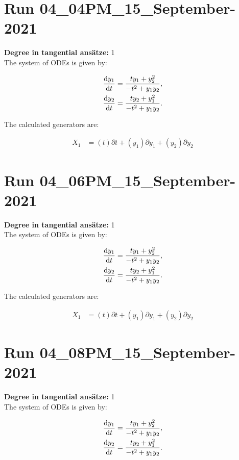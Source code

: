 \section*{Run 04\_04PM\_15\_September-2021}
\textbf{Degree in tangential ansätze:}	1\\
The system of ODEs is given by:

\begin{align*}
\dv{y_{1}}{t}&=\frac{t y_{1} + y_{2}^{2}}{- t^{2} + y_{1} y_{2}},\\
\dv{y_{2}}{t}&=\frac{t y_{2} + y_{1}^{2}}{- t^{2} + y_{1} y_{2}}.\\
\end{align*}

\noindent The calculated generators are:

\begin{align*}
X_{1}&=\left( t \right)\partial t+\left( y_{1} \right)\partial y_{1}+\left( y_{2} \right)\partial y_{2}\end{align*}
\section*{Run 04\_06PM\_15\_September-2021}
\textbf{Degree in tangential ansätze:}	1\\
The system of ODEs is given by:

\begin{align*}
\dv{y_{1}}{t}&=\frac{t y_{1} + y_{2}^{2}}{- t^{2} + y_{1} y_{2}},\\
\dv{y_{2}}{t}&=\frac{t y_{2} + y_{1}^{2}}{- t^{2} + y_{1} y_{2}}.\\
\end{align*}

\noindent The calculated generators are:

\begin{align*}
X_{1}&=\left( t \right)\partial t+\left( y_{1} \right)\partial y_{1}+\left( y_{2} \right)\partial y_{2}\end{align*}
\section*{Run 04\_08PM\_15\_September-2021}
\textbf{Degree in tangential ansätze:}	1\\
The system of ODEs is given by:

\begin{align*}
\dv{y_{1}}{t}&=\frac{t y_{1} + y_{2}^{2}}{- t^{2} + y_{1} y_{2}},\\
\dv{y_{2}}{t}&=\frac{t y_{2} + y_{1}^{2}}{- t^{2} + y_{1} y_{2}}.\\
\end{align*}

